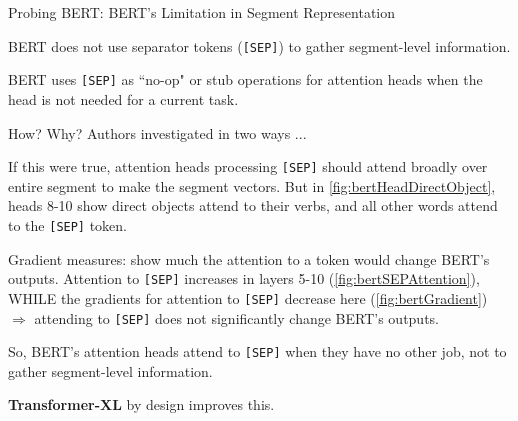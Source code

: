 \begin{frame}{Probing BERT: BERT's Limitation in Segment Representation}
    
    \begin{itemizeSpaced}{10pt}
        \item BERT does not use separator tokens (\texttt{[SEP]}) to gather segment-level information. 
        
        \pinkbox BERT uses \texttt{[SEP]} as ``no-op" or stub operations for attention heads when the head is not needed for a current task. 
        
        \item How? Why? Authors investigated in two ways ...
        
        \begin{itemizeSpaced}{10pt}
        
            \item If this were true, attention heads processing \texttt{[SEP]} should attend broadly over entire segment to make the segment vectors. But in \cref{fig:bertHeadDirectObject}, heads 8-10 show direct objects attend to their verbs, and all other words attend to the \texttt{[SEP]} token. 
            
            \item Gradient measures: show much the attention to a token would change BERT's outputs. Attention to \texttt{[SEP]} increases in layers 5-10 (\cref{fig:bertSEPAttention}), WHILE the gradients for attention to \texttt{[SEP]} decrease here (\cref{fig:bertGradient})  $\Rightarrow$ attending to \texttt{[SEP]} does not significantly change BERT's outputs. 
        \end{itemizeSpaced}
    \end{itemizeSpaced}
    


So, BERT's attention heads attend to \texttt{[SEP]} when they have no other job, not to gather segment-level information. 

\textbf{Transformer-XL} by design improves this.

\end{frame}





